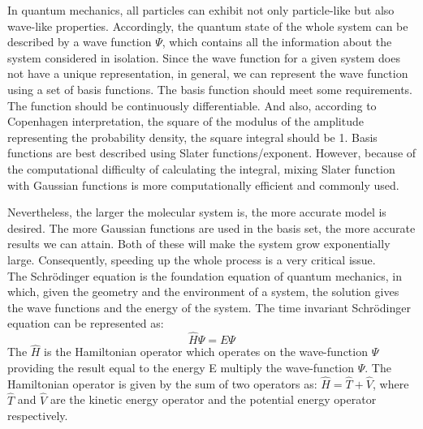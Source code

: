 \documentclass[twoside]{article}
\begin{document}
In quantum mechanics, all particles can exhibit not only particle-like but also wave-like properties. Accordingly, the quantum state of the whole system can be described by a wave function $\Psi$, which contains all the information about the system considered in isolation. Since the wave function for a given system does not have a unique representation, in general, we can represent the wave function using a set of basis functions. The basis function should meet some requirements.  The function should be continuously differentiable. And also, according to Copenhagen interpretation, the square of the modulus of the amplitude representing the probability density, the square integral should be 1. Basis functions are best described using Slater functions/exponent. However, because of the computational difficulty of calculating the integral, mixing Slater function with Gaussian functions is more computationally efficient and commonly used. 

Nevertheless, the larger the molecular system is, the more accurate model is desired. The more Gaussian functions are used in the basis set, the more accurate results we can attain. Both of these will make the system grow exponentially large. Consequently, speeding up the whole process is a very critical issue. \\






The Schr\"{o}dinger equation is the foundation equation of quantum mechanics, in which, given the geometry and the environment of a system, the solution gives the wave functions and the energy of the system. 
The time invariant Schr\"{o}dinger equation can be represented as:
\[
				\hat{H}\Psi = E\Psi
\]
The $\hat{H}$ is the Hamiltonian operator which operates on the wave-function $\Psi$ providing the result equal to the energy E multiply the wave-function $\Psi$. The Hamiltonian operator is given by the sum of two operators as: $\hat{H} = \hat{T} + \hat{V}$,  where $\hat{T}$ and $\hat{V}$ are the kinetic energy operator and the potential energy operator respectively.
\end{document}
